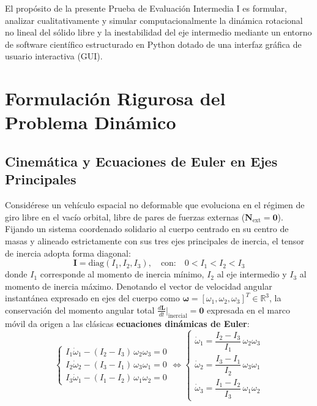 \documentclass[11pt, a4paper]{article}
\begin{document}
El propósito de la presente Prueba de Evaluación Intermedia I es formular, 
analizar cualitativamente y simular computacionalmente la dinámica rotacional 
no lineal del sólido libre y la inestabilidad del eje intermedio mediante un entorno 
de software científico estructurado en Python dotado de una interfaz gráfica de usuario interactiva (GUI).

\section{Formulación Rigurosa del Problema Dinámico}

\subsection{Cinemática y Ecuaciones de Euler en Ejes Principales}
Considérese un vehículo espacial no deformable que 
evoluciona en el régimen de giro libre en el vacío orbital, 
libre de pares de fuerzas externas ($\mathbf{N}_{\text{ext}} = \mathbf{0}$). Fijando un sistema coordenado solidario al cuerpo centrado en su centro de masas y alineado estrictamente con sus tres ejes principales de inercia, el tensor de inercia adopta forma diagonal:
\begin{equation}
\mathbf{I} = \text{diag}(I_1, I_2, I_3), \quad \text{con:} \quad 0 < I_1 < I_2 < I_3
\end{equation}
donde $I_1$ corresponde al momento de inercia mínimo, $I_2$ al eje intermedio y $I_3$ al momento de inercia máximo. Denotando el vector de velocidad angular instantánea expresado en ejes del cuerpo como $\boldsymbol{\omega} = [\omega_1, \omega_2, \omega_3]^T \in \mathbb{R}^3$, la conservación del momento angular total $\frac{d\mathbf{L}}{dt}\big|_{\text{inercial}} = \mathbf{0}$ expresada en el marco móvil da origen a las clásicas \textbf{ecuaciones dinámicas de Euler}:
\begin{equation}\label{eq:euler}
\begin{cases}
I_1 \dot{\omega}_1 - (I_2 - I_3)\,\omega_2 \omega_3 = 0 \\[0.4em]
I_2 \dot{\omega}_2 - (I_3 - I_1)\,\omega_3 \omega_1 = 0 \\[0.4em]
I_3 \dot{\omega}_1 - (I_1 - I_2)\,\omega_1 \omega_2 = 0
\end{cases}
\iff
\begin{cases}
\dot{\omega}_1 = \dfrac{I_2 - I_3}{I_1}\,\omega_2 \omega_3 \\[0.6em]
\dot{\omega}_2 = \dfrac{I_3 - I_1}{I_2}\,\omega_3 \omega_1 \\[0.6em]
\dot{\omega}_3 = \dfrac{I_1 - I_2}{I_3}\,\omega_1 \omega_2
\end{cases}
\end{equation}
\end{document}
